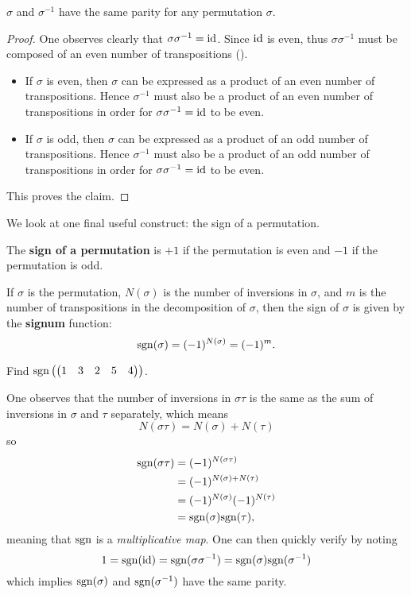 \begin{corollary}\label{corollary-permutation-and-inverse-have-same-parity}
    $\sigma$ and $\sigma^{-1}$ have the same parity for any permutation $\sigma$.
\end{corollary}
\begin{proof}
    One observes clearly that $\sigma\sigma^{-1} = \mathrm{id}$. Since $\mathrm{id}$ is even, thus $\sigma\sigma^{-1}$ must be composed of an even number of transpositions ().
    \begin{itemize}
        \item If $\sigma$ is even, then $\sigma$ can be expressed as a product of an even number of transpositions. Hence $\sigma^{-1}$ must also be a product of an even number of transpositions in order for $\sigma\sigma^{-1} = \mathrm{id}$ to be even.
        \item If $\sigma$ is odd, then $\sigma$ can be expressed as a product of an odd number of transpositions. Hence $\sigma^{-1}$ must also be a product of an odd number of transpositions in order for $\sigma\sigma^{-1} = \mathrm{id}$ to be even.
    \end{itemize}
    This proves the claim.
\end{proof}

We look at one final useful construct: the sign of a permutation.
\begin{definition}
    The \textbf{sign of a permutation} is $+1$ if the permutation is even and $-1$ if the permutation is odd.
\end{definition}
If $\sigma$ is the permutation, $N(\sigma)$ is the number of inversions in $\sigma$, and $m$ is the number of transpositions in the decomposition of $\sigma$, then the sign of $\sigma$ is given by the \textbf{signum} function:
\[
    \mathrm{sgn}(\sigma) = (-1)^{N(\sigma)} = (-1)^m.
\]
\begin{exercise}
    Find $\mathrm{sgn}\left(\begin{pmatrix}1&3&2&5&4\end{pmatrix}\right)$.
\end{exercise}

One observes that the number of inversions in $\sigma\tau$ is the same as the sum of inversions in $\sigma$ and $\tau$ separately, which means
\[
    N(\sigma\tau) = N(\sigma) + N(\tau)
\]
so
\begin{align*}
    \mathrm{sgn}(\sigma\tau) &= (-1)^{N(\sigma\tau)}\\
    &= (-1)^{N(\sigma) + N(\tau)}\\
    &= (-1)^{N(\sigma)}(-1)^{N(\tau)}\\
    &= \mathrm{sgn}(\sigma)\mathrm{sgn}(\tau),
\end{align*}
meaning that $\mathrm{sgn}$ is a \textit{multiplicative map}. One can then quickly verify  by noting
\[
    1 = \mathrm{sgn}(\mathrm{id}) = \mathrm{sgn}(\sigma\sigma^{-1}) = \mathrm{sgn}(\sigma)\mathrm{sgn}(\sigma^{-1})
\]
which implies $\mathrm{sgn}(\sigma)$ and $\mathrm{sgn}(\sigma^{-1})$ have the same parity.

